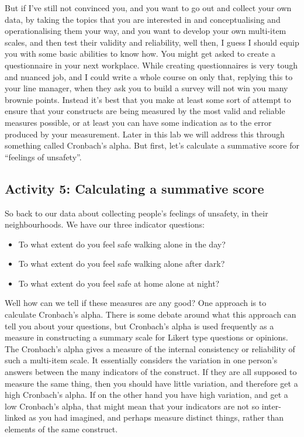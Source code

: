 \documentclass[]{book}
\providecommand{\tightlist}{%
  \setlength{\itemsep}{0pt}\setlength{\parskip}{0pt}}
\theoremstyle{definition}
\theoremstyle{definition}
\theoremstyle{definition}
\theoremstyle{remark}
\begin{document}
But if I've still not convinced you, and you want to go out and collect
your own data, by taking the topics that you are interested in and
conceptualising and operationalising them your way, and you want to
develop your own multi-item scales, and then test their validity and
reliability, well then, I guess I should equip you with some basic
abilities to know how. You might get asked to create a questionnaire in
your next workplace. While creating questionnaires is very tough and
nuanced job, and I could write a whole course on only that, replying
this to your line manager, when they ask you to build a survey will not
win you many brownie points. Instead it's best that you make at least
some sort of attempt to ensure that your constructs are being measured
by the most valid and reliable measures possible, or at least you can
have some indication as to the error produced by your measurement. Later
in this lab we will address this through something called Cronbach's
alpha. But first, let's calculate a summative score for ``feelings of
unsafety''.

\hypertarget{activity-5-calculating-a-summative-score}{%
\subsection{Activity 5: Calculating a summative
score}\label{activity-5-calculating-a-summative-score}}

So back to our data about collecting people's feelings of unsafety, in
their neighbourhoods. We have our three indicator questions:

\begin{itemize}
\tightlist
\item
  To what extent do you feel safe walking alone in the day?
\item
  To what extent do you feel safe walking alone after dark?
\item
  To what extent do you feel safe at home alone at night?
\end{itemize}

Well how can we tell if these measures are any good? One approach is to
calculate Cronbach's alpha. There is some debate around what this
approach can tell you about your questions, but Cronbach's alpha is used
frequently as a measure in constructing a summary scale for Likert type
questions or opinions. The Cronbach's alpha gives a measure of the
internal consistency or reliability of such a multi-item scale. It
essentially considers the variation in one person's answers between the
many indicators of the construct. If they are all supposed to measure
the same thing, then you should have little variation, and therefore get
a high Cronbach's alpha. If on the other hand you have high variation,
and get a low Cronbach's alpha, that might mean that your indicators are
not so inter-linked as you had imagined, and perhaps measure distinct
things, rather than elements of the same construct.
\end{document}
